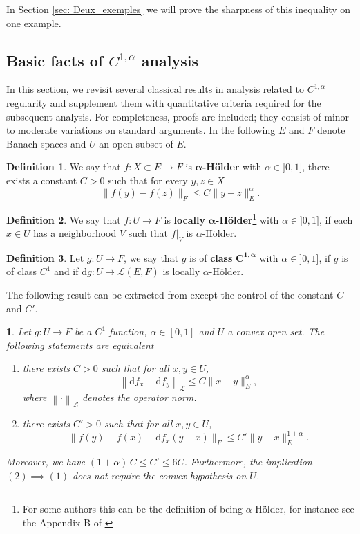 \documentclass[11pt,reqno,a4paper]{article}%
\newtheorem{lemma}[theorem]{\sc{Lemma}}
\theoremstyle{definition}
\newtheorem{definition}{Definition}[section]
\theoremstyle{remark}
\renewcommand{\leq}{\leqslant}
\newcommand{\opnorm}[1]{{\left\| #1 \right\|}_{\mathcal{L}}}
\renewcommand{\d}{\mathrm{d}}
\renewcommand{\d}{\mathrm{d}}
\begin{document}
\noindent In Section \ref{sec: Deux_exemples} we will prove the sharpness of this inequality on one example.




\subsection{Basic facts of $C^{1,\alpha}$  analysis}

In this section, we revisit several classical results in analysis related to $C^{1,\alpha}$ regularity and supplement them with quantitative criteria required for the subsequent analysis. 
For completeness, proofs are included; they consist of minor to moderate variations on standard arguments.
In the following $E$ and $F$ denote Banach spaces and $U$ an open subset of $E$. 

\begin{definition}
    We say that $f : X \subset E \to F$ is $\boldsymbol{\alpha}$\textbf{-Hölder} with $\alpha \in ] 0 , 1]$, there exists a constant $C > 0$ such that for every $y,z \in X$
    \[ \| f(y) - f(z)\|_F \leq C \|y -z\|_E^\alpha. \]
\end{definition}

\begin{definition}
    We say that $f : U \to F$ is \textbf{locally} $\boldsymbol{\alpha}$\textbf{-Hölder}\footnote{For some authors this can be the definition of being $\alpha$-Hölder, for instance see the Appendix B of \cite[pp 138 to 143]{ruelle1989elements} } with $\alpha \in ] 0 , 1]$, if each $x \in U$ has a neighborhood $V$ such that $f |_V$ is $\alpha$-Hölder.
\end{definition}

\begin{definition}
    Let $g : U \to F$, we say that $g$ is of \textbf{class} $\boldsymbol{C^{1,\alpha}}$ with $\alpha \in ] 0 , 1]$, if $g$ is of class $C^1$ and if $\d g : U \mapsto \mathscr{L}(E,F)$ is locally $\alpha$-Hölder.
\end{definition}

\noindent  The following result can be extracted from \cite{ANDERSSON1997} except the control of the constant $C$ and $C'$.
\begin{lemma} \label{lem: carac_c_1_alpha}
    Let $g : U \to F$ be a $C^{1}$ function, $\alpha \in [0,1]$ and $U$ a convex open set.
    The following statements are equivalent
    \begin{enumerate}
        \item there exists $C > 0$ such that for all $x,y \in U$,
    \[\opnorm{ \d f_x - \d f_y} \leq C \|x -y\|_E^\alpha,\]
    where $\opnorm{\cdot}$ denotes the operator norm.

        \item there exists $C' > 0$ such that for all $x,y \in U$,
    \[\| f(y) - f(x) - \d f_x(y-x)\|_F \leq C' \|y-x\|_E^{1 + \alpha}.\]
    \end{enumerate}
    Moreover, we have $(1+\alpha)\,  C \leq C' \leq 6 C$. Furthermore, the implication $(2) \implies (1)$ does not require the convex hypothesis on $U$.
\end{lemma}
\end{document}
